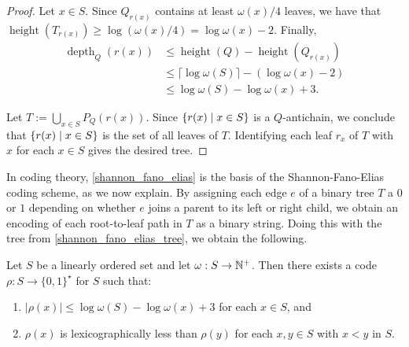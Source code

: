 \documentclass{patmorin}
\renewcommand{\le}{\leqslant}
\renewcommand{\geq}{\geqslant}
\DeclareMathOperator{\height}{height}
\DeclareMathOperator{\depth}{depth}
\DeclarePairedDelimiter{\set}{\{}{\}}
\begin{document}
\begin{proof}
    Let $x\in S$. Since $Q_{r(x)}$ contains at least $\omega(x)/4$ leaves, we have that
$\height(T_{r(x)}) \geq \log(\omega(x)/4) = \log\omega(x) - 2$.
Finally,
     \begin{align*}
     \depth_Q(r(x))
     &\le \height(Q)-\height(Q_{r(x)})\\
     &\le \lceil\log\omega(S)\rceil - (\log\omega(x) - 2)\\
     &\le \log\omega(S) - \log\omega(x) +3.
     \end{align*}

    Let $T:=\bigcup_{x\in S} P_Q(r(x))$.
    Since $\set{r(x) \mid x\in S}$ is a $Q$-antichain,
    we conclude that $\set{r(x)\mid x\in S}$ is the set of all leaves of $T$.
    Identifying each leaf $r_x$ of $T$ with $x$ for each $x\in S$ gives the desired tree.
   \end{proof}




  In coding theory, \cref{shannon_fano_elias} is the basis of the Shannon-Fano-Elias coding scheme, as we now explain.  By assigning each edge $e$ of a binary tree $T$ a $0$ or $1$ depending on whether $e$ joins a parent to its left or right child, we obtain an encoding of each root-to-leaf path in $T$ as a binary string. Doing this with the tree from \cref{shannon_fano_elias_tree}, we obtain the following.

  \begin{cor}\label{shannon_fano_elias_code}\label{shannon_fano_elias_cor}
    Let $S$ be a linearly ordered set and let $\omega:S\to\mathbb{N}^+$.  Then there exists a code $\rho:S\to \{0,1\}^\star$ for $S$ such that:
    \begin{enumerate}[nosep,nolistsep,label=(\alph*)]
      \item $|\rho(x)|\le \log\omega(S) - \log\omega(x)+3$ for each $x\in S$, and
      \item $\rho(x)$ is lexicographically less than $\rho(y)$ for each $x,y\in S$ with $x< y$ in $S$.
    \end{enumerate}
  \end{cor}
\end{document}

